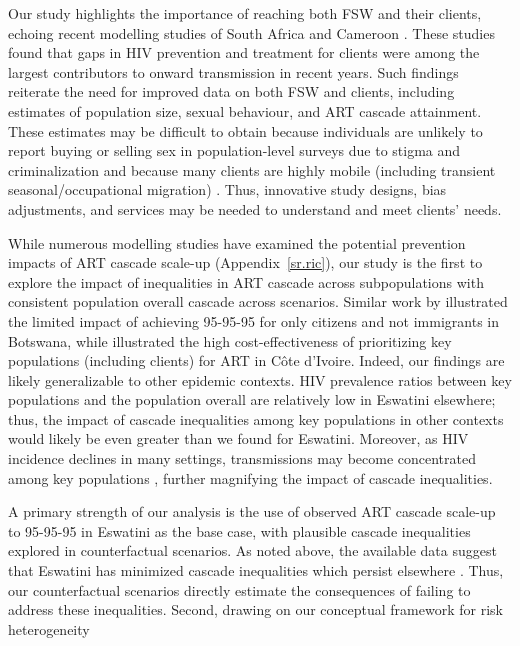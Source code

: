 Our study highlights the importance of reaching both FSW and their clients,
echoing recent modelling studies of South Africa and Cameroon \cite{Stone2021,Silhol2024}.
These studies found that gaps in HIV prevention and treatment for clients
were among the largest contributors to onward transmission in recent years.
Such findings reiterate the need for improved data on both FSW and clients,
including estimates of population size, sexual behaviour, and ART cascade attainment.
These estimates may be difficult to obtain
because individuals are unlikely to report buying or selling sex in population-level surveys
due to stigma and criminalization \cite{Behanzin2013} and
because many clients are highly mobile
(including transient seasonal/occupational migration) \cite{Camlin2019}.
Thus, innovative study designs, bias adjustments, and services may be needed
to understand and meet clients' needs.
\par
While numerous modelling studies have examined
the potential prevention impacts of ART cascade scale-up
\cite{Knight2022sr} (Appendix~\ref{sr.ric}),
our study is the first to explore the impact of
inequalities in ART cascade across subpopulations
with consistent population overall cascade across scenarios.
Similar work by \citet{Marukutira2020} illustrated the limited impact of
achieving 95-95-95 for only citizens and not immigrants in Botswana,
while \citet{Maheu-Giroux2019cost} illustrated the high cost-effectiveness of
prioritizing key populations (including clients) for ART in C\^{o}te d’Ivoire.
Indeed, our findings are likely generalizable to other epidemic contexts.
HIV prevalence ratios between key populations and the population overall
are relatively low in Eswatini \vs elsewhere;
thus, the impact of cascade inequalities among key populations in other contexts
would likely be even greater than we found for Eswatini.
Moreover, as HIV incidence declines in many settings,
transmissions may become concentrated among key populations \cite{Brown2019},
further magnifying the impact of cascade inequalities.
\par
A primary strength of our analysis is the use of
observed ART cascade scale-up to 95-95-95 in Eswatini as the base case,
with plausible cascade inequalities explored in counterfactual scenarios.
As noted above, the available data suggest that Eswatini has
minimized cascade inequalities which persist elsewhere \cite{Hakim2018}.
Thus, our counterfactual scenarios directly estimate
the consequences of failing to address these inequalities.
Second, drawing on our conceptual framework for risk heterogeneity \cite[Table~1]{Knight2022sr}
